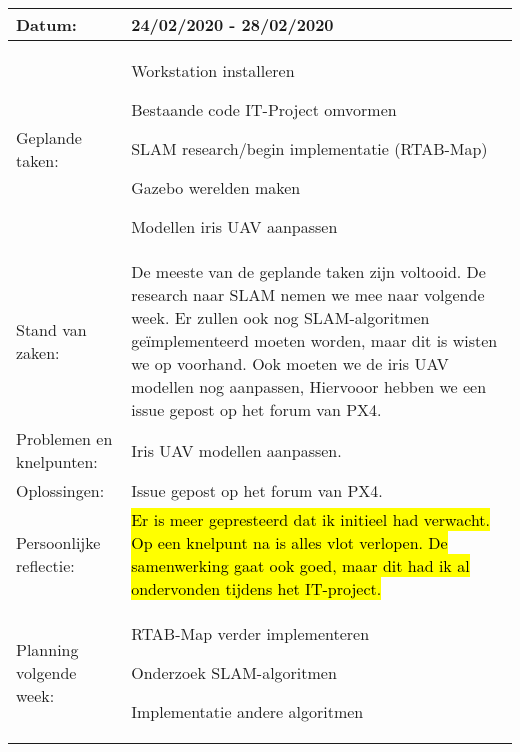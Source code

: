 \begin{tabularx}{\textwidth}{| l | X |}
  \hline
  Datum: & 24/02/2020 - 28/02/2020\\
  \hline
  Geplande taken: &
  \begin{compactitem}
    \item Workstation installeren
    \item Bestaande code IT-Project omvormen
    \item SLAM research/begin implementatie (RTAB-Map)
    \item Gazebo werelden maken
    \item Modellen iris UAV aanpassen
  \end{compactitem}\\
  \hline
  Stand van zaken: & De meeste van de geplande taken zijn voltooid. De research naar SLAM nemen we mee naar volgende week. Er zullen ook nog SLAM-algoritmen geïmplementeerd moeten worden, maar dit is wisten we op voorhand. Ook moeten we de iris UAV modellen nog aanpassen, Hiervooor hebben we een issue gepost op het forum van PX4.\\
  \hline
  Problemen en knelpunten: & Iris UAV modellen aanpassen.\\
  \hline
  Oplossingen: & Issue gepost op het forum van PX4.\\
  \hline
  Persoonlijke reflectie: & \hl{Er is meer gepresteerd dat ik initieel had verwacht. Op een knelpunt na is alles vlot verlopen. De samenwerking gaat ook goed, maar dit had ik al ondervonden tijdens het IT-project.}\\
  \hline
  Planning volgende week: & 
  \begin{compactitem}
    \item RTAB-Map verder implementeren
    \item Onderzoek SLAM-algoritmen
    \item Implementatie andere algoritmen
  \end{compactitem}\\
  \hline
\end{tabularx}
